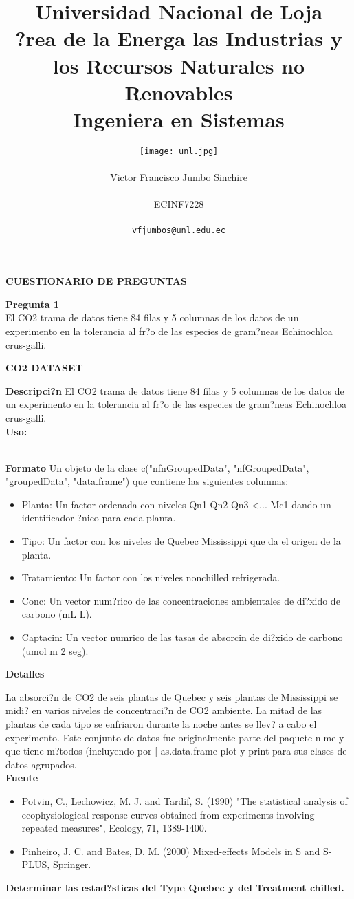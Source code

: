 \documentclass[11pt]{report}
\title{\Huge Universidad Nacional de Loja \\ 
?rea de la Energa las Industrias y los Recursos Naturales no Renovables \\
Ingeniera en Sistemas \\}
\author{\texttt{[image: unl.jpg]}\\\\ Victor Francisco Jumbo Sinchire \\\\ ECINF7228 \\\\ \texttt{vfjumbos@unl.edu.ec}}
\begin{document}

\maketitle
\begin{center}\textbf{CUESTIONARIO DE PREGUNTAS}\end{center}
\textbf{Pregunta 1}\\
El CO2 trama de datos tiene 84 filas y 5 columnas de los datos de un experimento en la tolerancia al fr?o de las especies de gram?neas Echinochloa crus-galli.
\\
\begin{center}\textbf{CO2 DATASET}\end{center}
\textbf{Descripci?n}
El CO2 trama de datos tiene 84 filas y 5 columnas de los datos de un experimento en la tolerancia al fr?o de las especies de gram?neas Echinochloa crus-galli.
\\
\textbf{Uso:}

\\
\textbf{Formato}
Un objeto de la clase c("nfnGroupedData", "nfGroupedData", "groupedData", "data.frame") que contiene las siguientes columnas:
\begin{itemize}
\item Planta: Un factor ordenada con niveles Qn1 Qn2 Qn3 <... Mc1 dando un identificador ?nico para cada planta.
\item Tipo: Un factor con los niveles de Quebec Mississippi que da el origen de la planta.
\item Tratamiento: Un factor con los niveles nonchilled refrigerada.
\item Conc: Un vector num?rico de las concentraciones ambientales de di?xido de carbono (mL L).
\item Captacin: Un vector numrico de las tasas de absorcin de di?xido de carbono (umol m  2 seg).
\end{itemize}
\textbf{Detalles}

La absorci?n de CO2 de seis plantas de Quebec y seis plantas de Mississippi se midi? en varios niveles de concentraci?n de CO2 ambiente.  La mitad de las plantas de cada tipo se enfriaron durante la noche antes se llev? a cabo el experimento. Este conjunto de datos fue originalmente parte del paquete nlme y que tiene m?todos (incluyendo por [ as.data.frame plot y print para sus clases de datos agrupados.
\\
\textbf{Fuente}
\begin{itemize}
\item Potvin, C., Lechowicz, M. J. and Tardif, S. (1990) "The statistical analysis of ecophysiological response curves obtained from experiments involving repeated measures", Ecology, 71, 1389-1400. 
\item Pinheiro, J. C. and Bates, D. M. (2000) Mixed-effects Models in S and S-PLUS, Springer.
\end{itemize}
\textbf{Determinar las estad?sticas del Type Quebec y del Treatment chilled.}
\end{document}
